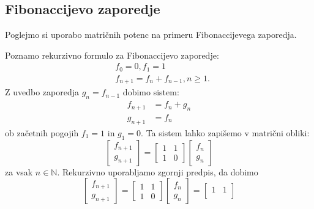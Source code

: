 \documentclass[mat1]{fmfdelo}
\begin{document}
\subsection{Fibonaccijevo zaporedje}
Poglejmo si uporabo matričnih potenc na primeru Fibonaccijevega zaporedja.
\begin{zgled} 
    Poznamo rekurzivno formulo za Fibonaccijevo zaporedje:
    \begin{align*}
        &f_0 = 0, f_1 = 1 \\
        &f_{n+1} = f_n + f_{n-1}, n \geq 1.
    \end{align*}
    Z uvedbo zaporedja $g_n = f_{n-1}$ dobimo sistem:
    \begin{align*}
        f_{n+1} &= f_n + g_n \\
        g_{n+1} &= f_n
    \end{align*}
    ob začetnih pogojih $f_1 = 1$ in $g_1 = 0$. Ta sistem lahko zapišemo v matrični obliki:
    \begin{equation*}
        \begin{bmatrix}
            f_{n+1} \\
            g_{n+1}
        \end{bmatrix}
        =
        \begin{bmatrix}
            1 & 1 \\
            1 & 0
        \end{bmatrix}
        \begin{bmatrix}
            f_n \\
            g_n
        \end{bmatrix}
    \end{equation*}
    za vsak $n \in \mathbb{N}$. Rekurzivno uporabljamo zgornji predpis, da dobimo
    \begin{equation*}
        \begin{bmatrix}
            f_{n+1} \\
            g_{n+1}
        \end{bmatrix}
        =
        \begin{bmatrix}
            1 & 1 \\
            1 & 0
        \end{bmatrix}
        \begin{bmatrix}
            f_n \\
            g_n
        \end{bmatrix}
        =
        \begin{bmatrix}
            1 & 1 \\

\end{bmatrix}
\end{equation*}
\end{zgled}
\end{document}
